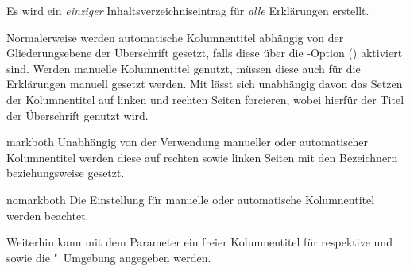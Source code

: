 \begin{Declaration*}{}
\begin{Declaration*}{}
\begin{Declaration*}{}
\begin{Declaration}
\begin{values}{}
  Es wird ein \emph{einziger} Inhaltsverzeichniseintrag für \emph{alle} 
  Erklärungen erstellt.
\end{values}
%
Normalerweise werden automatische Kolumnentitel abhängig von der 
Gliederungsebene der Überschrift gesetzt, falls diese über die 
\KOMAScript-Option () aktiviert 
sind. Werden manuelle Kolumnentitel genutzt, müssen diese auch für die 
Erklärungen manuell gesetzt werden. Mit  lässt 
sich unabhängig davon das Setzen der Kolumnentitel auf linken und rechten 
Seiten forcieren, wobei hierfür der Titel der Überschrift genutzt wird.
%
\begin{values}{}
\item[markboth]
  Unabhängig von der Verwendung manueller oder automatischer Kolumnentitel 
  werden diese auf rechten sowie linken Seiten mit den Bezeichnern 
   beziehungsweise  gesetzt.
\item[nomarkboth]
  Die Einstellung für manuelle oder automatische Kolumnentitel werden beachtet.
\end{values}
%
Weiterhin kann mit dem Parameter  ein 
freier Kolumnentitel für  respektive  
und  sowie die "~Umgebung angegeben 
werden.


\end{Declaration}
\end{Declaration*}
\end{Declaration*}
\end{Declaration*}
